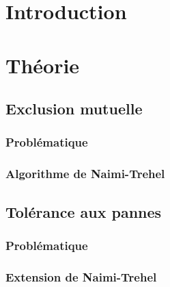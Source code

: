 \documentclass[a4paper,french,towsides,10pt]{book}
\begin{document}
\renewcommand{\labelitemii}{\textasteriskcentered}

\dominitoc

\clearemptydoublepage

\tableofcontents
\clearemptydoublepage


\chapter*{Introduction}


\chapter{Théorie}

\section{Exclusion mutuelle}
\subsection{Problématique}

\subsection{Algorithme de Naimi-Trehel}


\section{Tolérance aux pannes}
\subsection{Problématique}

\subsection{Extension de Naimi-Trehel}

\end{document}
